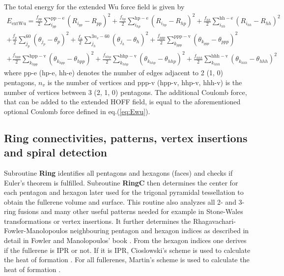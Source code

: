 \documentclass[article,a4paper,twoside]{memoir}
\newcommand{\funname}[1]{{\color{blue}\textbf{#1}}}
\begin{document}
The total energy for the extended Wu force field is given by
\begin{multline}
  \label{eq:extEwu}
  E_{\mathrm{extWu}} =
          \frac{f_{pp}}{2}  \sum_{i_{pp}}^{\mathrm{pp-e}} \left(R_{i_{pp}} - R_{pp}\right)^2 
        + \frac{f_{hp}}{2}  \sum_{i_{hp}}^{\mathrm{hp-e}} \left(R_{i_{hp}} - R_{hp}\right)^2 
        + \frac{f_{hh}}{2}  \sum_{i_{hh}}^{\mathrm{hh-e}} \left(R_{i_{hh}} - R_{hh}\right)^2\\
        + \frac{f_p}{2}     \sum_{j_p}^{60} \left(\theta_{j_p} - \theta_p\right)^2 
        + \frac{f_h}{2}     \sum_{j_h}^{3n_v-60} \left(\theta_{j_h} - \theta_h\right)^2 
        + \frac{f_{ppp}}{2} \sum_{k_{ppp}}^{\mathrm{ppp-v}} \left(\theta_{k_{ppp}} - \theta_{ppp}\right)^2 \\
        + \frac{f_{hpp}}{2} \sum_{k_{hpp}}^{\mathrm{hpp-v}} \left(\theta_{k_{hpp}} - \theta_{hpp}\right)^2 
        + \frac{f_{hhp}}{2} \sum_{k_{hhp}}^{\mathrm{hhp-v}} \left(\theta_{k_{hhp}} - \theta_{hhp}\right)^2 
        + \frac{f_{hhh}}{2} \sum_{k_{hhh}}^{\mathrm{hhh-v}} \left(\theta_{k_{hhh}} - \theta_{hhh}\right)^2
\end{multline}
where pp-e (hp-e, hh-e) denotes the number of edges adjacent to 2 (1, 0) pentagons, $n_v$ is the 
number of vertices and ppp-v (hpp-v, hhp-v, hhh-v) is the number of vertices between 3 (2, 1, 0) pentagons.
The additional Coulomb force, that can be added to the extended HOFF field, is equal to the aforementioned
optional Coulomb force defined in eq.(\ref{eq:Ewu}).

\subsection{Ring connectivities, patterns, vertex insertions and spiral detection}
Subroutine \funname{Ring} identifies all pentagons and hexagons (faces) and checks if Euler's theorem is fulfilled.
Subroutine \funname{RingC} then determines the center for each pentagon and hexagon later used for the trigonal pyramidal tessellation to obtain
the fullerene volume and surface. This routine also analyzes all 2- and 3-ring fusions and many other useful patterns needed for example
in Stone-Wales transformations or vertex insertions. It further determines the Rhagavachari-Fowler-Manolopoulos neighbouring pentagon 
and hexagon indices as described in detail in Fowler and Manolopoulos' book \cite{Atlas}.
From the hexagon indices one derives if the fullerene is IPR or not. If it is IPR, Cioslowski's scheme is used to calculate the 
heat of formation \cite{Cioslowski2000}. For all fullerenes, Martin's scheme is used to calculate the heat of formation \cite{Alcami}.
\end{document}
